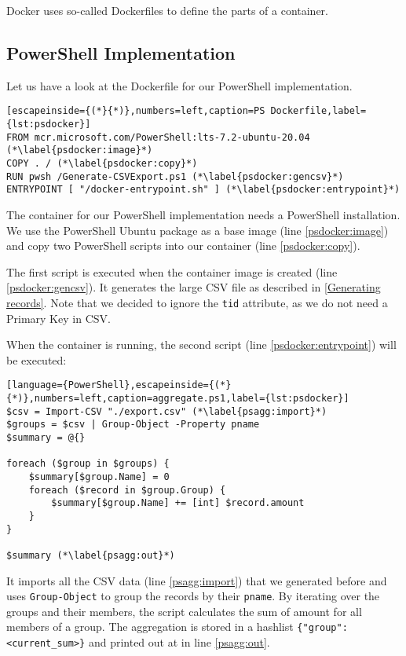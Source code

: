 \gls{Docker} uses so-called Dockerfiles to define the parts of a container.

\subsection{PowerShell Implementation}

Let us have a look at the Dockerfile for our \gls{PowerShell} implementation.

\begin{lstlisting}[escapeinside={(*}{*)},numbers=left,caption=PS Dockerfile,label={lst:psdocker}]
FROM mcr.microsoft.com/PowerShell:lts-7.2-ubuntu-20.04 (*\label{psdocker:image}*)
COPY . / (*\label{psdocker:copy}*)
RUN pwsh /Generate-CSVExport.ps1 (*\label{psdocker:gencsv}*)
ENTRYPOINT [ "/docker-entrypoint.sh" ] (*\label{psdocker:entrypoint}*)
\end{lstlisting}
The container for our \gls{PowerShell} implementation needs
a \gls{PowerShell} installation. We use the \gls{PowerShell} Ubuntu package \cite{dockerPS}
as a base image (line \ref{psdocker:image})
and copy two \gls{PowerShell} scripts into our container (line \ref{psdocker:copy}).

The first script is executed when the container image is created
(line \ref{psdocker:gencsv}). It generates the large \gls{CSV}
file as described in \ref{Generating records}. Note that we
decided to ignore the \verb+tid+ attribute, as we do not
need a Primary Key in \gls{CSV}.

When the container is running, the second script
(line \ref{psdocker:entrypoint}) will be executed:

\begin{lstlisting}[language={PowerShell},escapeinside={(*}{*)},numbers=left,caption=aggregate.ps1,label={lst:psdocker}]
$csv = Import-CSV "./export.csv" (*\label{psagg:import}*)
$groups = $csv | Group-Object -Property pname
$summary = @{}

foreach ($group in $groups) {
    $summary[$group.Name] = 0
    foreach ($record in $group.Group) {
        $summary[$group.Name] += [int] $record.amount
    }
}

$summary (*\label{psagg:out}*)
\end{lstlisting}
It imports all the \gls{CSV} data (line \ref{psagg:import}) that we generated
before and uses \verb+Group-Object+ to group the records by their \verb+pname+.
By iterating over the groups and their members, the script calculates
the sum of amount for all members of a group. The
aggregation is stored in a hashlist
\verb+{"group": <current_sum>}+ and printed out at in line \ref{psagg:out}.

